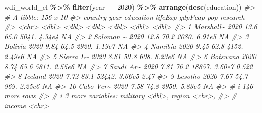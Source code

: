 \documentclass[
  xelatex, ja=standard]{bxjsbook}
\newenvironment{Shaded}{\begin{snugshade}}{\end{snugshade}}
\newcommand{\CommentTok}[1]{\textcolor[rgb]{0.56,0.35,0.01}{\textit{#1}}}
\newcommand{\DecValTok}[1]{\textcolor[rgb]{0.00,0.00,0.81}{#1}}
\newcommand{\FunctionTok}[1]{\textcolor[rgb]{0.13,0.29,0.53}{\textbf{#1}}}
\newcommand{\NormalTok}[1]{#1}
\newcommand{\SpecialCharTok}[1]{\textcolor[rgb]{0.81,0.36,0.00}{\textbf{#1}}}
\theoremstyle{definition}
\theoremstyle{definition}
\theoremstyle{definition}
\theoremstyle{definition}
\theoremstyle{remark}
\begin{document}
\begin{Shaded}
\begin{Highlighting}[]
\NormalTok{wdi\_world\_el }\SpecialCharTok{\%\textgreater{}\%} \FunctionTok{filter}\NormalTok{(year}\SpecialCharTok{==}\DecValTok{2020}\NormalTok{) }\SpecialCharTok{\%\textgreater{}\%} \FunctionTok{arrange}\NormalTok{(}\FunctionTok{desc}\NormalTok{(education))}
\CommentTok{\#\textgreater{} \# A tibble: 156 x 10}
\CommentTok{\#\textgreater{}    country    year education lifeExp gdpPcap    pop research}
\CommentTok{\#\textgreater{}    \textless{}chr\textgreater{}     \textless{}dbl\textgreater{}     \textless{}dbl\textgreater{}   \textless{}dbl\textgreater{}   \textless{}dbl\textgreater{}  \textless{}dbl\textgreater{}    \textless{}dbl\textgreater{}}
\CommentTok{\#\textgreater{}  1 Marshall\textasciitilde{}  2020     13.6     65.0   5041. 4.34e4   NA    }
\CommentTok{\#\textgreater{}  2 Solomon \textasciitilde{}  2020     12.8     70.2   2080. 6.91e5   NA    }
\CommentTok{\#\textgreater{}  3 Bolivia    2020      9.84    64.5   2920. 1.19e7   NA    }
\CommentTok{\#\textgreater{}  4 Namibia    2020      9.45    62.8   4152. 2.49e6   NA    }
\CommentTok{\#\textgreater{}  5 Sierra L\textasciitilde{}  2020      8.81    59.8    608. 8.23e6   NA    }
\CommentTok{\#\textgreater{}  6 Botswana   2020      8.74    65.6   5811. 2.55e6   NA    }
\CommentTok{\#\textgreater{}  7 Saudi Ar\textasciitilde{}  2020      7.81    76.2  18857. 3.60e7    0.522}
\CommentTok{\#\textgreater{}  8 Iceland    2020      7.72    83.1  52442. 3.66e5    2.47 }
\CommentTok{\#\textgreater{}  9 Lesotho    2020      7.67    54.7    969. 2.25e6   NA    }
\CommentTok{\#\textgreater{} 10 Cabo Ver\textasciitilde{}  2020      7.58    74.8   2950. 5.83e5   NA    }
\CommentTok{\#\textgreater{} \# i 146 more rows}
\CommentTok{\#\textgreater{} \# i 3 more variables: military \textless{}dbl\textgreater{}, region \textless{}chr\textgreater{},}
\CommentTok{\#\textgreater{} \#   income \textless{}chr\textgreater{}}
\end{Highlighting}
\end{Shaded}
\end{document}
